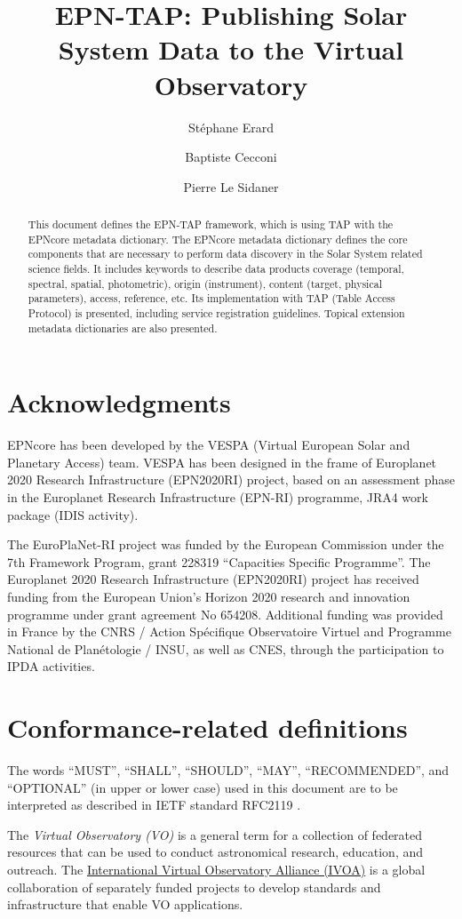 \documentclass[11pt,a4paper]{ivoa}
\title{EPN-TAP: Publishing Solar System Data to the Virtual Observatory}
\author{St\'ephane Erard}
\author{Baptiste Cecconi}
\author{Pierre Le Sidaner}
\begin{document}
\begin{abstract}
This document defines the EPN-TAP framework, which is using TAP with the EPNcore metadata dictionary. The EPNcore metadata dictionary defines the core components that are necessary 
to perform data discovery in the Solar System related science fields. It includes keywords to describe data products coverage (temporal, spectral, 
spatial, photometric), origin (instrument), content (target, physical parameters), access, reference, etc. Its implementation with TAP (Table Access Protocol) is presented, including service registration guidelines. Topical extension metadata dictionaries are also presented.
\end{abstract}


\section*{Acknowledgments}

EPNcore has been developed by the VESPA (Virtual European Solar and Planetary Access) team. 
VESPA has been designed in the frame of Europlanet 2020 Research Infrastructure (EPN2020RI) project, based on an assessment phase in the Europlanet Research Infrastructure (EPN-RI) programme, JRA4 work package (IDIS activity).

The EuroPlaNet-RI project was funded by the European Commission under the 7th Framework Program, grant 228319 ``Capacities Specific Programme''.
The Europlanet 2020 Research Infrastructure (EPN2020RI) project has received funding from the European Union's Horizon 2020 research and innovation programme under grant agreement No 654208. 
Additional funding was provided in France by the CNRS / Action Sp\'ecifique Observatoire Virtuel and Programme National de Plan\'etologie / INSU, as well as CNES, through the participation to IPDA activities.

\section*{Conformance-related definitions}

The words ``MUST'', ``SHALL'', ``SHOULD'', ``MAY'', ``RECOMMENDED'', and
``OPTIONAL'' (in upper or lower case) used in this document are to be
interpreted as described in IETF standard RFC2119 \citep{std:RFC2119}.

The \emph{Virtual Observatory (VO)} is a
general term for a collection of federated resources that can be used
to conduct astronomical research, education, and outreach.
The \href{http://www.ivoa.net}{International
Virtual Observatory Alliance (IVOA)} is a global
collaboration of separately funded projects to develop standards and
infrastructure that enable VO applications.
\end{document}
